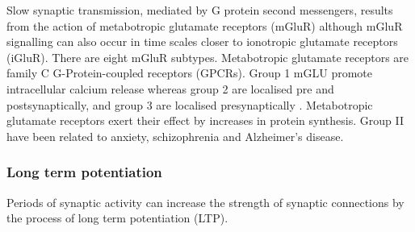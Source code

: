 Slow synaptic transmission, mediated by G protein second messengers, results from the action of metabotropic glutamate receptors (mGluR) \cite{niswender2010metabotropic} although mGluR signalling can also occur in time scales closer to ionotropic glutamate receptors (iGluR). There are eight mGluR subtypes. Metabotropic glutamate receptors are family C G-Protein-coupled receptors (GPCRs). Group 1 mGLU promote intracellular calcium release whereas group 2 are localised pre and postsynaptically, and group 3 are localised presynaptically \cite{niswender2010metabotropic}. 
Metabotropic glutamate receptors exert their effect by increases in protein synthesis. Group II have been related to anxiety, schizophrenia and Alzheimer's disease\cite{swanson2005metabotropic}.


\subsubsection{Long term potentiation}
\label{sec:LismanLTP}
Periods of synaptic activity can increase the strength of synaptic connections by the process of long term potentiation (LTP).

